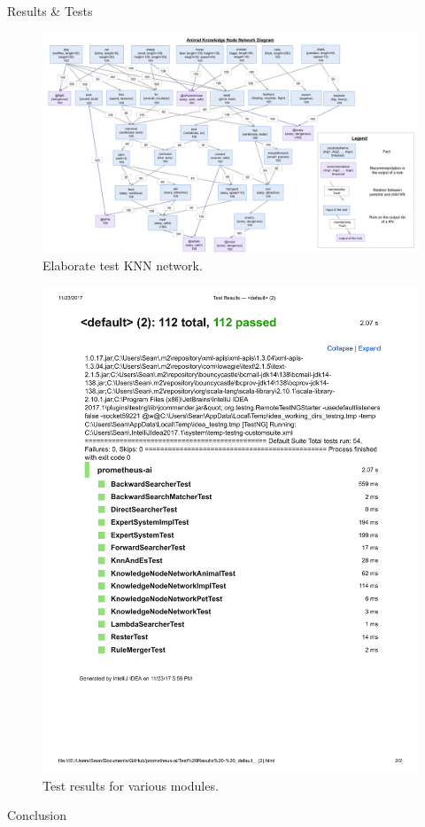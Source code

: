 \documentclass[final]{beamer} %
\begin{document}
\begin{columns}
\begin{column}{.3\textwidth}
\begin{block}{Results \& Tests}
			\begin{figure}[!htb]
				\centering
				\includegraphics[width=\textwidth]{figures/animal_knn.png}
				\caption
				{Elaborate test KNN network.}
			\end{figure}
		
			\begin{figure}[!htb]
				\centering
				\includegraphics[width=0.5\columnwidth]{figures/test_results.pdf}
				\caption
				{Test results for various modules.}
			\end{figure}
		\end{block}
		\begin{block}{Conclusion}
		\end{block}
	\end{column}
\end{columns}
\end{document}
